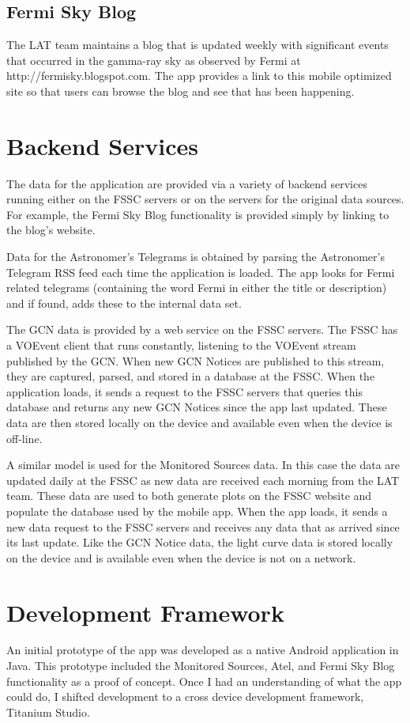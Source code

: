 \subsection{Fermi Sky Blog}
The LAT team maintains a blog that is updated weekly with significant events that occurred in the gamma-ray sky as observed by Fermi at http://fermisky.blogspot.com.  The app provides a link to this mobile optimized site so that users can browse the blog and see that has been happening.

\section{Backend Services}
The data for the application are provided via a variety of backend services running either on the FSSC servers or on the servers for the original data sources.  For example, the Fermi Sky Blog functionality is provided simply by linking to the blog's website.

Data for the Astronomer's Telegrams is obtained by parsing the Astronomer's Telegram RSS feed each time the application is loaded.  The app looks for Fermi related telegrams (containing the word Fermi in either the title or description) and if found, adds these to the internal data set.

The GCN data is provided by a web service on the FSSC servers.  The FSSC has a VOEvent client that runs constantly, listening to the VOEvent stream published by the GCN.  When new GCN Notices are published to this stream, they are captured, parsed, and stored in a database at the FSSC.  When the application loads, it sends a request to the FSSC servers that queries this database and returns any new GCN Notices since the app last updated.  These data are then stored locally on the device and available even when the device is off-line.

A similar model is used for the Monitored Sources data.  In this case the data are updated daily at the FSSC as new data are received each morning from the LAT team.  These data are used to both generate plots on the FSSC website and populate the database used by the mobile app.  When the app loads, it sends a new data request to the FSSC servers and receives any data that as arrived since its last update.  Like the GCN Notice data, the light curve data is stored locally on the device and is available even when the device is not on a network.

\section{Development Framework}
An initial prototype of the app was developed as a native Android application in Java.  This prototype included the Monitored Sources, Atel, and Fermi Sky Blog functionality as a proof of concept.  Once I had an understanding of what the app could do, I shifted development to a cross device development framework, Titanium Studio.  


